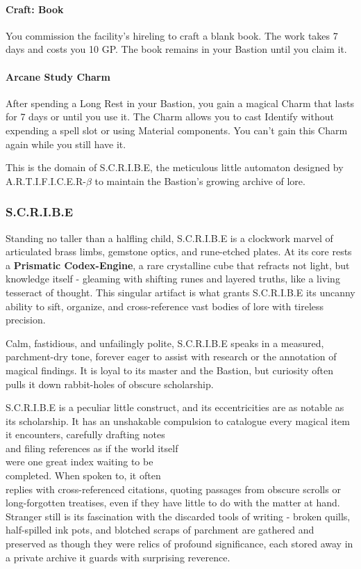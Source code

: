 {\entryfont \paragraph*{Craft: Book} You commission the facility's hireling to craft a blank book. The work takes 7 days and costs you 10 GP. The book remains in your Bastion until you claim it.}

{\entryfont \paragraph*{Arcane Study Charm} After spending a Long Rest in your Bastion, you gain a magical Charm that lasts for 7 days or until you use it. The Charm allows you to cast Identify without expending a spell slot or using Material components. You can't gain this  Charm again while you still have it.}

{\entryfont This is the domain of S.C.R.I.B.E, the meticulous little automaton designed by A.R.T.I.F.I.C.E.R-$\beta$ to maintain the Bastion's growing archive of lore.}
\subsubsection*{S.C.R.I.B.E}
{\entryfont Standing no taller than a halfling child, S.C.R.I.B.E is a clockwork marvel of articulated brass limbs, gemstone optics, and rune-etched plates. At its core rests a \textbf{Prismatic Codex-Engine}, a rare crystalline cube that refracts not light, but knowledge itself - gleaming with shifting runes and layered truths, like a living tesseract of thought. This singular artifact is what grants S.C.R.I.B.E its uncanny ability to sift, organize, and cross-reference vast bodies of lore with tireless precision.

Calm, fastidious, and unfailingly polite, S.C.R.I.B.E speaks in a measured, parchment-dry tone, forever eager to assist with research or the annotation of magical findings. It is loyal to its master and the Bastion, but curiosity often pulls it down rabbit-holes of obscure scholarship.

S.C.R.I.B.E is a peculiar little construct, and its eccentricities are as notable as its scholarship. It has an unshakable compulsion to catalogue every magical item it encounters, carefully drafting notes\\and filing references as if the world itself\\were one great index waiting to be\\completed. When spoken to, it often\\replies with cross-referenced citations, quoting passages from obscure scrolls or long-forgotten treatises, even if they have little to do with the matter at hand. Stranger still is its fascination with the discarded tools of writing - broken quills, half-spilled ink pots, and blotched scraps of parchment are gathered and preserved as though they were relics of profound significance, each stored away in a private archive it guards with surprising reverence.}


